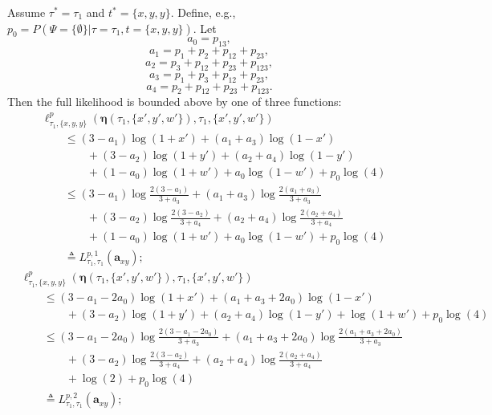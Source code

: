 \documentclass[a4paper]{article}
\newcommand{\fullAncestralSplitPartitions}{\boldsymbol\eta}
\newcommand{\siteSplitRV}{\Psi}
\begin{document}
Assume $\tau^*=\tau_1$ and $t^*=\{x,y,y\}$.
Define, e.g., $p_0 = P(\siteSplitRV=\{\emptyset\}|\tau=\tau_1,t=\{x,y,y\})$.
Let
$$
    a_{0} = p_{13},
$$
$$
    a_{1} = p_1+p_2+p_{12}+p_{23},
$$
$$
    a_{2} = p_3+p_{12}+p_{23}+p_{123},
$$
$$
    a_{3} = p_1+p_3+p_{12}+p_{23},
$$
$$
    a_{4} = p_2+p_{12}+p_{23}+p_{123}.
$$
Then the full likelihood is bounded above by one of three functions:
\begin{align*}
    & \ell^p_{\tau_1,\{x,y,y\}}(\fullAncestralSplitPartitions(\tau_1,\{x',y',w'\}),\tau_1,\{x',y',w'\}) \\
    &\qquad \le (3-a_{1})\log(1+x')+(a_{1}+a_{3})\log(1-x')\\
    &\qquad \qquad +(3-a_{2})\log(1+y')+(a_{2}+a_{4})\log(1-y')\\
    &\qquad \qquad +(1-a_{0})\log(1+w')+a_{0}\log(1-w')+p_{0}\log(4)\\
    &\qquad \le (3-a_{1})\log\frac{2(3-a_{1})}{3+a_{3}}+(a_{1}+a_{3})\log\frac{2(a_{1}+a_{3})}{3+a_{3}}\\
    &\qquad \qquad +(3-a_{2})\log\frac{2(3-a_{2})}{3+a_{4}}+(a_{2}+a_{4})\log\frac{2(a_{2}+a_{4})}{3+a_{4}}\\
    &\qquad \qquad +(1-a_{0})\log(1+w')+a_{0}\log(1-w')+p_{0}\log(4)\\
    &\qquad \triangleq L^{p,1}_{\tau_1,\tau_1}(\mathbf{a}_{xy});
\end{align*}
\begin{align*}
    & \ell^p_{\tau_1,\{x,y,y\}}(\fullAncestralSplitPartitions(\tau_1,\{x',y',w'\}),\tau_1,\{x',y',w'\}) \\
    &\qquad \le (3-a_{1}-2a_{0})\log(1+x')+(a_{1}+a_{3}+2a_{0})\log(1-x')\\
    &\qquad \qquad +(3-a_{2})\log(1+y')+(a_{2}+a_{4})\log(1-y')+\log(1+w')+p_{0}\log(4)\\
    &\qquad \le (3-a_{1}-2a_{0})\log\frac{2(3-a_{1}-2a_{0})}{3+a_{3}}+(a_{1}+a_{3}+2a_{0})\log\frac{2(a_{1}+a_{3}+2a_{0})}{3+a_{3}}\\
    &\qquad \qquad +(3-a_{2})\log\frac{2(3-a_{2})}{3+a_{4}}+(a_{2}+a_{4})\log\frac{2(a_{2}+a_{4})}{3+a_{4}}\\
    &\qquad \qquad +\log(2)+p_{0}\log(4)\\
    &\qquad \triangleq L^{p,2}_{\tau_1,\tau_1}(\mathbf{a}_{xy});
\end{align*}
\end{document}

